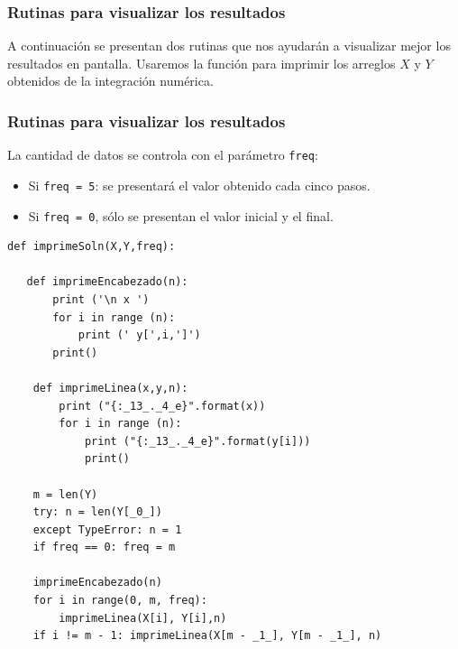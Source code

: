 \begin{frame}
\frametitle{Rutinas para visualizar los resultados}
A continuación se presentan dos rutinas que nos ayudarán a visualizar mejor los resultados en pantalla. Usaremos la función  para imprimir los arreglos $X$ y $Y$ obtenidos de la integración numérica. 
\end{frame}
\begin{frame}
\frametitle{Rutinas para visualizar los resultados}
La cantidad de datos se controla con el parámetro \texttt{freq}:
\begin{itemize}[<+->]
\item Si \texttt{freq = 5}: se presentará el valor obtenido cada cinco pasos.
\item Si \texttt{freq = 0}, sólo se presentan el valor inicial y el final.
\end{itemize}
\end{frame}
\begin{frame}
\begin{lstlisting}[caption=Función para visualizar los datos, style=FormattedNumber, basicstyle=\linespread{1.1}\ttfamily=\small, columns=fullflexible]
def imprimeSoln(X,Y,freq):
   
   def imprimeEncabezado(n):
       print ('\n x ')
       for i in range (n):
           print (' y[',i,']')
       print()
    
    def imprimeLinea(x,y,n):
        print ("{:_13_._4_e}".format(x))
        for i in range (n):
            print ("{:_13_._4_e}".format(y[i]))
            print()

    m = len(Y)
    try: n = len(Y[_0_])
    except TypeError: n = 1
    if freq == 0: freq = m

    imprimeEncabezado(n)
    for i in range(0, m, freq):
        imprimeLinea(X[i], Y[i],n)
    if i != m - 1: imprimeLinea(X[m - _1_], Y[m - _1_], n)
\end{lstlisting}
\end{frame}
